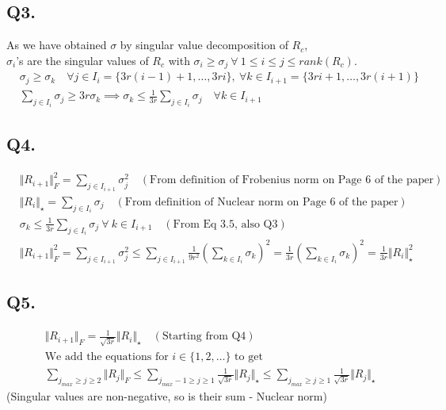 \documentclass[fleqn, 11pt]{article}
\begin{document}
\subsection*{Q3.}
As we have obtained $\sigma$ by singular value decomposition of $R_c$, \\
$\sigma_i$'s are the singular values of $R_c$ with $\sigma_i \ge \sigma_j \ \forall \ 1 \le i \le j \le rank(R_c)$. \\
\begin{equation*}
    \begin{aligned}
        & \sigma_j \ge \sigma_k \quad \forall j \in I_i = \{ 3r(i-1)+1, \dots, 3ri\},\ \forall k \in I_{i+1} = \{ 3ri+1, \dots, 3r(i+1)\} \\
        & \sum_{j \in I_i} \sigma_j \ge 3r \sigma_k \implies \sigma_k \le \frac{1}{3r} \sum_{j \in I_i} \sigma_j \quad \forall k \in I_{i+1}
    \end{aligned}
\end{equation*}

\subsection*{Q4.}
\begin{equation*}
    \begin{aligned}
        & \Vert R_{i+1} \Vert_F^2 = \sum_{j \in I_{i+1}} \sigma_j^2 \quad (\text{From definition of Frobenius norm on Page 6 of the paper}) \\
        & \Vert R_i \Vert_\star = \sum_{j \in I_i} \sigma_j \quad (\text{From definition of Nuclear norm on Page 6 of the paper}) \\
        & \sigma_k \le \frac{1}{3r} \sum_{j \in I_i} \sigma_j \ \forall \ k \in I_{i+1} \quad (\text{From Eq 3.5, also Q3}) \\
        & \Vert R_{i+1} \Vert_F^2 = \sum_{j \in I_{i+1}} \sigma_j^2 \le \sum_{j \in I_{i+1}} \frac{1}{9r^2} \left( \sum_{k \in I_i} \sigma_k \right)^2 = \frac{1}{3r} \left( \sum_{k \in I_i} \sigma_k \right)^2 = \frac{1}{3r} \Vert R_i \Vert_\star^2
    \end{aligned}
\end{equation*}

\subsection*{Q5.}
\begin{equation*}
    \begin{aligned}
        & \Vert R_{i+1} \Vert_F = \frac{1}{\sqrt{3r}} \Vert R_i \Vert_\star \quad (\text{Starting from Q4}) \\
        & \text{We add the equations for $i \in \{1, 2, \dots\}$ to get} \\
        & \sum_{j_{max} \ge j \ge 2} \Vert R_j \Vert_F \le \sum_{j_{max} - 1 \ge j \ge 1} \frac{1}{\sqrt{3r}} \Vert R_j \Vert_\star \le \sum_{j_{max} \ge j \ge 1} \frac{1}{\sqrt{3r}} \Vert R_j \Vert_\star
    \end{aligned}
\end{equation*}
(Singular values are non-negative, so is their sum - Nuclear norm)
\end{document}
